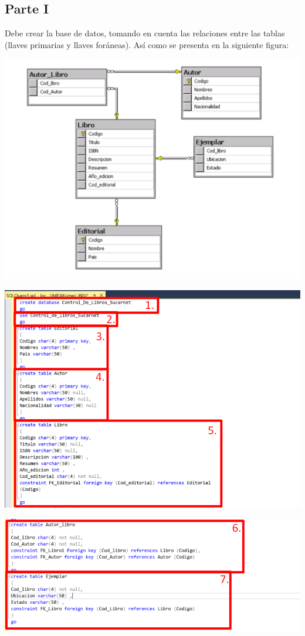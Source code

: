 \documentclass[12pt,letterpaper]{article}
\begin{document}
\subsection{Parte I}
Debe crear la base de datos, tomando en cuenta las relaciones entre las
tablas (llaves primarias y llaves foráneas). Así como se presenta en la siguiente
figura:
\begin{center}
    \includegraphics[width=14cm]{img/graph.png}  
\end{center}
\begin{center}
    \includegraphics[width=17cm]{img/1.png}
    \vspace{2cm}  
\end{center}
\begin{center}
    \includegraphics[width=17cm]{img/2.png}
    \vspace{3cm}  
\end{center}
\end{document}
